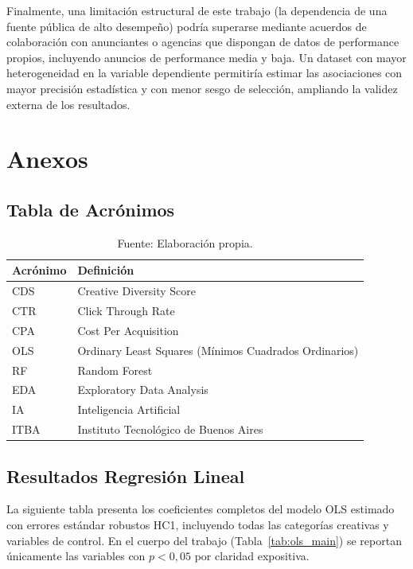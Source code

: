 \documentclass[12pt, a4paper]{report}
\begin{document}
Finalmente, una limitación estructural de este trabajo (la dependencia de una fuente
pública de alto desempeño) podría superarse mediante acuerdos de colaboración con
anunciantes o agencias que dispongan de datos de performance propios, incluyendo
anuncios de performance media y baja. Un dataset con mayor heterogeneidad en la
variable dependiente permitiría estimar las asociaciones con mayor precisión estadística y
con menor sesgo de selección, ampliando la validez externa de los resultados.




\appendix
\chapter{Anexos}

\section{Tabla de Acrónimos}

\begin{table}[H]
  \centering
  \caption{Tabla de acrónimos utilizados en el trabajo}
  \label{tab:acronimos}
  \begin{tabular}{ll}
    \toprule
    \textbf{Acrónimo} & \textbf{Definición} \\
    \midrule
    CDS  & Creative Diversity Score \\
    CTR  & Click Through Rate \\
    CPA  & Cost Per Acquisition \\
    OLS  & Ordinary Least Squares (Mínimos Cuadrados Ordinarios) \\
    RF   & Random Forest \\
    EDA  & Exploratory Data Analysis \\
    IA   & Inteligencia Artificial \\
    ITBA & Instituto Tecnológico de Buenos Aires \\
    \bottomrule
  \end{tabular}
  \caption*{\small Fuente: Elaboración propia.}
\end{table}

\section{Resultados Regresión Lineal}

La siguiente tabla presenta los coeficientes completos del modelo OLS estimado con
errores estándar robustos HC1, incluyendo todas las categorías creativas y variables
de control. En el cuerpo del trabajo (Tabla~\ref{tab:ols_main}) se reportan únicamente
las variables con $p < 0{,}05$ por claridad expositiva.



\end{document}
